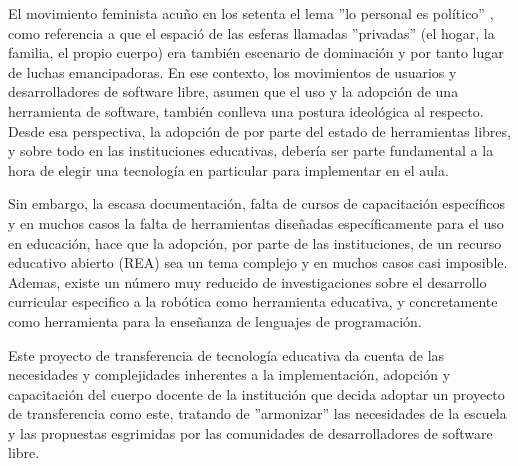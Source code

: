  El movimiento feminista acuño en los setenta el lema ''lo personal es político'' \citep{hanisch1969personal}, como referencia a que el espació de las esferas llamadas ''privadas'' (el hogar, la familia, el propio cuerpo) era también escenario de dominación y por tanto lugar de luchas emancipadoras. En ese contexto, los movimientos de usuarios y desarrolladores de software libre, asumen que el uso y la adopción de una herramienta de software, también conlleva una postura ideológica al respecto. Desde esa perspectiva, la adopción de por parte del estado de herramientas libres, y sobre todo en las instituciones educativas, debería ser parte fundamental a la hora de elegir una tecnología en particular para implementar en el aula.
 
 Sin embargo, la escasa documentación, falta de cursos de capacitación específicos y en muchos casos la falta de herramientas diseñadas específicamente para el uso en educación, hace que la adopción, por parte de las instituciones, de un recurso educativo abierto (REA) sea un tema complejo y en muchos casos casi imposible. Ademas, existe  un  número  muy reducido  de investigaciones  sobre  el desarrollo curricular especifico a la robótica como herramienta educativa, y concretamente  como herramienta para la enseñanza de lenguajes de programación.  
 
 Este proyecto de transferencia de tecnología educativa da cuenta de las necesidades y complejidades inherentes a la implementación, adopción y capacitación del cuerpo docente de la institución que decida adoptar un proyecto de transferencia como este, tratando de ''armonizar'' las necesidades de la escuela y las propuestas esgrimidas por las comunidades de desarrolladores de software libre.
 
 
